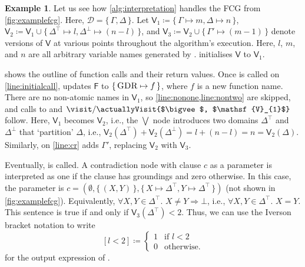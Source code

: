 \documentclass{article}
\theoremstyle{definition}
\newtheorem{example}{Example}
\theoremstyle{remark}
\newcommand{\Vone}{\mathsf{V}_{1}}
\newcommand{\Vtwo}{\mathsf{V}_{2}}
\newcommand{\Vthree}{\mathsf{V}_{3}}
\DeclareMathOperator{\CR}{\textsc{CR}}
\DeclareMathOperator{\GDR}{\textsc{GDR}}
\begin{document}
\begin{example}\label{example:interpretation}
  Let us see how \cref{alg:interpretation} handles the FCG from
  \cref{fig:examplefcg}. Here, $\mathcal{D} = \{\, \Gamma, \Delta \,\}$. Let
  $\Vone \coloneqq \{\, \Gamma \mapsto m, \Delta \mapsto n \,\}$,
  $\Vtwo \coloneqq \Vone \cup \{\, \Delta^{\top} \mapsto l, \Delta^{\bot} \mapsto (n-l) \,\}$,
  and $\Vthree \coloneqq \Vtwo \cup \{\, \Gamma' \mapsto (m-1) \,\}$ denote
  versions of $\mathsf{V}$ at various points throughout the algorithm's
  execution. Here, $l$, $m$, and $n$ are all arbitrary variable names generated
  by \newVariableName.  initialises $\mathsf{V}$ to $\Vone$.

   shows the outline of function calls and their return
  values. Once \visit{$\GDR$, $\Vone$} is called on \cref{line:initialcall},
  \newFunctionName updates $\mathsf{F}$ to $\{\, \GDR \mapsto f \,\}$, where $f$
  is a new function name. There are no non-atomic names in $\Vone$, so
  \cref{line:nonone,line:nontwo} are skipped, and calls to
  \actuallyVisit{$\GDR$, $\Vone$} and
  $\visit/\actuallyVisit{$\bigvee$, $\Vone$}$ follow. Here, $\Vone$ becomes
  $\Vtwo$, i.e., the $\bigvee$ node introduces two domains $\Delta^{\top}$ and
  $\Delta^{\bot}$ that `partition' $\Delta$, i.e.,
  $\Vtwo(\Delta^{\top}) + \Vtwo(\Delta^{\bot}) = l + (n-l) = n = \Vtwo(\Delta)$.
  Similarly, \actuallyVisit{$\CR$, $\Vtwo$} on \cref{line:cr} adds $\Gamma'$,
  replacing $\Vtwo$ with $\Vthree$.

  Eventually, \actuallyVisit{$\bot$, $\Vthree$} is called. A contradiction node
  with clause $c$ as a parameter is interpreted as one if the clause has
  groundings and zero otherwise. In this case, the parameter is
  $c = (\emptyset, \{\, (X, Y) \,\}, \{\, X \mapsto \Delta^\top, Y \mapsto \Delta^\top \,\})$
  (not shown in \cref{fig:examplefcg}). Equivalently,
  $\forall X, Y \in \Delta^{\top}\text{. }X \ne Y \Rightarrow \bot$, i.e.,
  $\forall X, Y \in \Delta^{\top}\text{. }X = Y$. This sentence is true if and
  only if $\Vthree(\Delta^{\top}) < 2$. Thus, we can use the Iverson bracket
  notation to write
  \[
    [l < 2] \coloneqq
    \begin{cases}
      1 & \text{if } l < 2 \\
      0 & \text{otherwise.}
    \end{cases}
  \]
  for the output expression of \actuallyVisit{$\bot$, $\Vthree$}.


\end{example}
\end{document}
